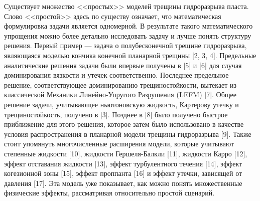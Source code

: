 \documentclass[main.tex]{subfiles}
\begin{document}
Существует множество <<простых>> моделей трещины гидроразрыва пласта.
Слово <<простой>> здесь по существу означает, что математическая формулировка задачи является одномерной.
В результате такого математического упрощения можно более детально исследовать задачу и лучше понять структуру решения.
Первый пример — задача о полубесконечной трещине гидроразрыва, являющаяся моделью кончика конечной планарной трещины [2, 3, 4].
Предельные аналитические решения задачи были впервые получены в [5] и [6] для случая доминирования вязкости и утечек соответственно.
Последнее предельное решение, соответствующее доминированию трещиностойкости, вытекает из классической Механики Линейно-Упругого Разрушения (LEFM) [7].
Общее решение задачи, учитывающее ньютоновскую жидкость, Картерову утечку и трещиностойкость, получено в [3].
Позднее в [8] было получено быстрое приближение для этого решения, которое затем было использовано в качестве условия распространения в планарной модели трещины гидроразрыва [9].
Также стоит упомянуть многочисленные расширения модели, которые учитывают степенные жидкости [10], жидкости Гершеля-Балкли [11], жидкости Карро [12], эффект отставания жидкости [13], эффект турбулентного течения [14], эффект когезионной зоны [15], эффект проппанта [16] и эффект утечки, зависящей от давления [17].
Эта модель уже показывает, как можно понять множественные физические эффекты, рассматривая относительно простой сценарий.
\end{document}

